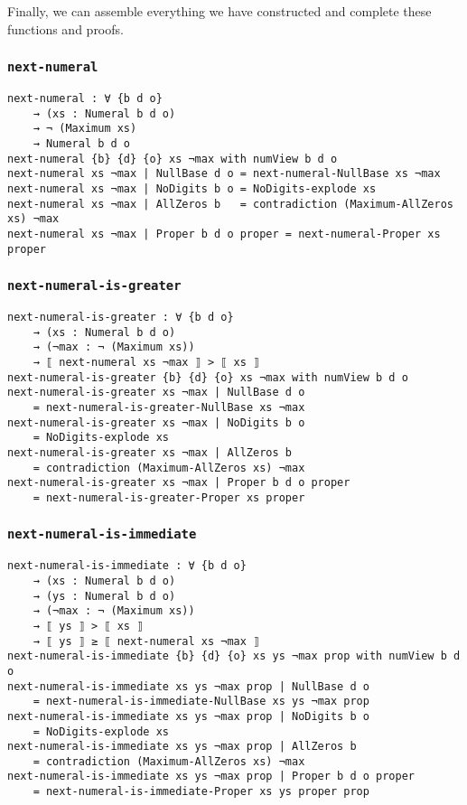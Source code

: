 \documentclass[\main/thesis.tex]{subfiles}
\begin{document}
Finally, we can assemble everything we have constructed and
complete these functions and proofs.

\subsubsection{{\lstinline|next-numeral|}}
\begin{lstlisting}[basicstyle=\ttfamily\scriptsize]
next-numeral : ∀ {b d o}
    → (xs : Numeral b d o)
    → ¬ (Maximum xs)
    → Numeral b d o
next-numeral {b} {d} {o} xs ¬max with numView b d o
next-numeral xs ¬max | NullBase d o = next-numeral-NullBase xs ¬max
next-numeral xs ¬max | NoDigits b o = NoDigits-explode xs
next-numeral xs ¬max | AllZeros b   = contradiction (Maximum-AllZeros xs) ¬max
next-numeral xs ¬max | Proper b d o proper = next-numeral-Proper xs proper

\end{lstlisting}

\subsubsection{{\lstinline|next-numeral-is-greater|}}
\begin{lstlisting}[basicstyle=\ttfamily\scriptsize]
next-numeral-is-greater : ∀ {b d o}
    → (xs : Numeral b d o)
    → (¬max : ¬ (Maximum xs))
    → ⟦ next-numeral xs ¬max ⟧ > ⟦ xs ⟧
next-numeral-is-greater {b} {d} {o} xs ¬max with numView b d o
next-numeral-is-greater xs ¬max | NullBase d o
    = next-numeral-is-greater-NullBase xs ¬max
next-numeral-is-greater xs ¬max | NoDigits b o
    = NoDigits-explode xs
next-numeral-is-greater xs ¬max | AllZeros b
    = contradiction (Maximum-AllZeros xs) ¬max
next-numeral-is-greater xs ¬max | Proper b d o proper
    = next-numeral-is-greater-Proper xs proper
\end{lstlisting}

\subsubsection{{\lstinline|next-numeral-is-immediate|}}
\begin{lstlisting}[basicstyle=\ttfamily\scriptsize]
next-numeral-is-immediate : ∀ {b d o}
    → (xs : Numeral b d o)
    → (ys : Numeral b d o)
    → (¬max : ¬ (Maximum xs))
    → ⟦ ys ⟧ > ⟦ xs ⟧
    → ⟦ ys ⟧ ≥ ⟦ next-numeral xs ¬max ⟧
next-numeral-is-immediate {b} {d} {o} xs ys ¬max prop with numView b d o
next-numeral-is-immediate xs ys ¬max prop | NullBase d o
    = next-numeral-is-immediate-NullBase xs ys ¬max prop
next-numeral-is-immediate xs ys ¬max prop | NoDigits b o
    = NoDigits-explode xs
next-numeral-is-immediate xs ys ¬max prop | AllZeros b
    = contradiction (Maximum-AllZeros xs) ¬max
next-numeral-is-immediate xs ys ¬max prop | Proper b d o proper
    = next-numeral-is-immediate-Proper xs ys proper prop
\end{lstlisting}
\end{document}
